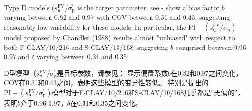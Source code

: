 \begin{ParaColumn}
    \switchcolumn*

    Type D models ($s_{u}^{\mathrm{FV}}/\sigma_{\mathrm{p}}^{\prime}$ is the target parameter, see - show a bias factor $b$ varying between 0.82 and 0.97 with COV between 0.31 and 0.43, suggesting reasonably low variability for these models. In particular, the $\mathrm{PI}-\left(s_{\mathrm{u}}^{\mathrm{FV}}/\sigma_{\mathrm{p}}^{\prime}\right)$ model proposed by Chandler (1988) results almost "unbiased" with respect to both F-CLAY/10/216 and S-CLAY/10/168, suggesting $b$ comprised between 0.96-0.97 and $\delta$ varying between 0.31 and 0.35.

    \switchcolumn

    D型模型（$s_{u}^{\mathrm{FV}}/\sigma_{\mathrm{p}}^{\prime}$是目标参数，请参见-）显示偏置系数$b$在0.82和0.97之间变化，COV在0.31和0.43之间，表明这些模型的变异性较低。 特别是\citet{Chandler198813}提出的$\mathrm{PI}-\left(s_{\mathrm{u}}^{\mathrm{FV}}/\sigma_{\mathrm{p}}^{\prime}\right)$模型对于F-CLAY/10/216和S-CLAY/10/168几乎都是“无偏的”，表明$b$介于0.96-0.97，$\delta$在0.31和0.35之间变化。

\end{ParaColumn}